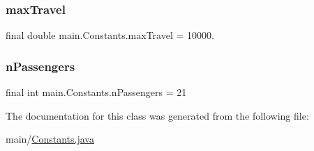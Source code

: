 \subsubsection{\texorpdfstring{max\+Travel}{maxTravel}}
{\footnotesize\ttfamily final double main.\+Constants.\+max\+Travel = 10000.\hspace{0.3cm}{\ttfamily [static]}}

\mbox{\label{classmain_1_1_constants_a4f0981009a65cde20f0cd7a0bd1f026c}} 
\subsubsection{\texorpdfstring{n\+Passengers}{nPassengers}}
{\footnotesize\ttfamily final int main.\+Constants.\+n\+Passengers = 21\hspace{0.3cm}{\ttfamily [static]}}



The documentation for this class was generated from the following file\+:\begin{DoxyCompactItemize}
\item 
main/\hyperlink{_constants_8java}{Constants.\+java}\end{DoxyCompactItemize}
